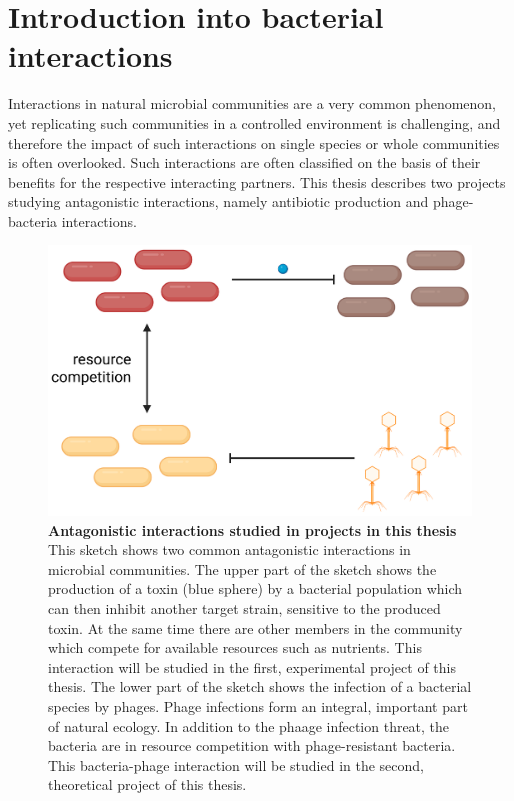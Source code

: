 \chapter{Introduction into bacterial interactions}
Interactions in natural microbial communities are a very common phenomenon, yet replicating such communities in a controlled environment is challenging, and therefore the impact of such interactions on single species or whole communities is often overlooked. Such interactions are often classified on the basis of their benefits for the respective interacting partners. This thesis describes two projects studying antagonistic interactions, namely antibiotic production and phage-bacteria interactions. 

\begin{figure}
\includegraphics[width=\linewidth]{graphics/2025_09_28_intro_fig1.png}
\caption{\textbf{Antagonistic interactions studied in projects in this thesis} This sketch shows two common antagonistic interactions in microbial communities. The upper part of the sketch shows the production of a toxin (blue sphere) by a bacterial population which can then inhibit another target strain, sensitive to the produced toxin. At the same time there are other members in the community which compete for available resources such as nutrients. This interaction will be studied in the first, experimental project of this thesis. The lower part of the sketch shows the infection of a bacterial species by phages. Phage infections form an integral, important part of natural ecology. In addition to the phaage infection threat, the bacteria are in resource competition with phage-resistant bacteria. This bacteria-phage interaction will be studied in the second, theoretical project of this thesis.}
\label{fig:intro_shared_interactions}
\end{figure}